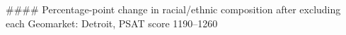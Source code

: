 #### Percentage-point change in racial/ethnic composition after excluding each Geomarket: Detroit, PSAT score 1190–1260
